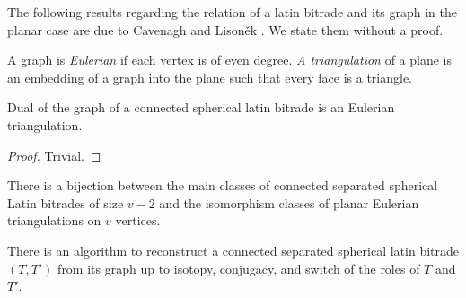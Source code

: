 The following results regarding the relation of a latin bitrade and its graph in the planar case are due to Cavenagh and Lisoněk \cite{CavenaghLisonek08}. We state them without a proof.

\begin{defn}
A graph is \emph{Eulerian} if each vertex is of even degree. \emph{A triangulation} of a plane is an embedding of a graph into the plane such that every face is a triangle.
\end{defn}

\begin{lem}
Dual of the graph of a connected spherical latin bitrade is an Eulerian triangulation.
\end{lem}
\begin{proof}
Trivial.
\end{proof}


\begin{thm}
\label{thm:connected-spherical-separated}
There is a bijection between the main classes of connected separated spherical Latin bitrades of size $v-2$ and the isomorphism classes of planar Eulerian triangulations on $v$ vertices.
\end{thm}%

\begin{cor}
\label{cor:connected-spherical-separated}
There is an algorithm to reconstruct a connected separated spherical latin bitrade $(T,T')$ from its graph up to isotopy, conjugacy, and switch of the roles of $T$ and $T'$.
\end{cor}%



